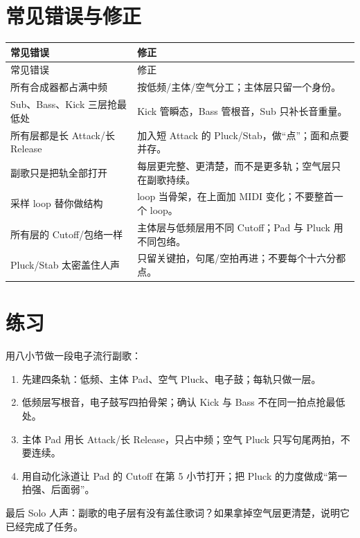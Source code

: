 
\section{常见错误与修正}
\label{sec:electronic-mistakes}

\begin{longtable}{p{}p{}}
\toprule
常见错误 & 修正 \\
\midrule
\endfirsthead
\toprule
常见错误 & 修正 \\
\midrule
\endhead
所有合成器都占满中频 & 按低频/主体/空气分工；主体层只留一个身份。 \\
Sub、Bass、Kick 三层抢最低处 & Kick 管瞬态，Bass 管根音，Sub 只补长音重量。 \\
所有层都是长 Attack/长 Release & 加入短 Attack 的 Pluck/Stab，做“点”；面和点要并存。 \\
副歌只是把轨全部打开 & 每层更完整、更清楚，而不是更多轨；空气层只在副歌持续。 \\
采样 loop 替你做结构 & loop 当骨架，在上面加 MIDI 变化；不要整首一个 loop。 \\
所有层的 Cutoff/包络一样 & 主体层与低频层用不同 Cutoff；Pad 与 Pluck 用不同包络。 \\
Pluck/Stab 太密盖住人声 & 只留关键拍，句尾/空拍再进；不要每个十六分都点。 \\
\bottomrule
\end{longtable}

\section{练习}
\label{sec:electronic-exercise}

\begin{exercise}
用八小节做一段电子流行副歌：
\begin{enumerate}
\item 先建四条轨：低频、主体 Pad、空气 Pluck、电子鼓；每轨只做一层。
\item 低频层写根音，电子鼓写四拍骨架；确认 Kick 与 Bass 不在同一拍点抢最低处。
\item 主体 Pad 用长 Attack/长 Release，只占中频；空气 Pluck 只写句尾两拍，不要连续。
\item 用自动化泳道让 Pad 的 Cutoff 在第 5 小节打开；把 Pluck 的力度做成“第一拍强、后面弱”。
\end{enumerate}
最后 Solo 人声：副歌的电子层有没有盖住歌词？如果拿掉空气层更清楚，说明它已经完成了任务。
\end{exercise}

